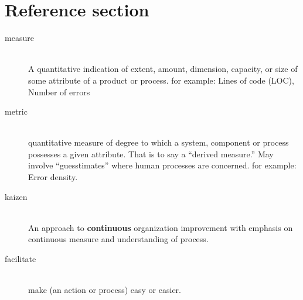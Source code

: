 \documentclass{article}
\begin{document}
\pagebreak

\section*{Reference section} \label{sec:reference}
\begin{description}
	\item[measure] \hfill \\ A quantitative indication of extent, amount, dimension, capacity, or size of some attribute of a product or process. for example: Lines of code (LOC), Number of errors
	\item[metric] \hfill \\ quantitative measure of degree to which a system, component or process possesses a given attribute. That is to say a “derived measure.” May involve “guesstimates” where human processes are concerned. for example: Error density.
	\item[kaizen] \hfill \\ An approach to \textbf{continuous} organization improvement with emphasis on continuous measure and understanding of process.
	\item[facilitate] \hfill \\ make (an action or process) easy or easier.
\end{description}
\end{document}
